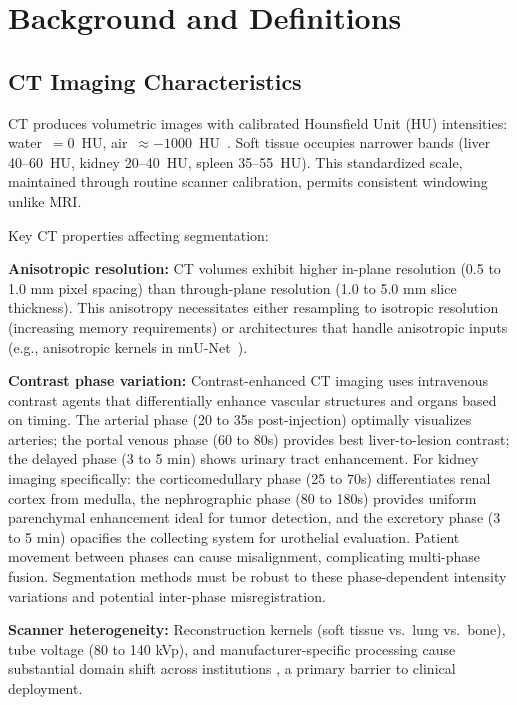 \section{Background and Definitions}
\label{sec:background}

\subsection{CT Imaging Characteristics}

CT produces volumetric images with calibrated Hounsfield Unit (HU) intensities: water~$=0$~HU, air~$\approx$$-1000$~HU~\cite{litjens2017survey}. Soft tissue occupies narrower bands (liver 40--60~HU, kidney 20--40~HU, spleen 35--55~HU). This standardized scale, maintained through routine scanner calibration, permits consistent windowing unlike MRI.

Key CT properties affecting segmentation:

\textbf{Anisotropic resolution:} CT volumes exhibit higher in-plane resolution (0.5 to 1.0 mm pixel spacing) than through-plane resolution (1.0 to 5.0 mm slice thickness). This anisotropy necessitates either resampling to isotropic resolution (increasing memory requirements) or architectures that handle anisotropic inputs (e.g., anisotropic kernels in nnU-Net~\cite{isensee2021nnunet}).

\textbf{Contrast phase variation:} Contrast-enhanced CT imaging uses intravenous contrast agents that differentially enhance vascular structures and organs based on timing. The arterial phase (20 to 35s post-injection) optimally visualizes arteries; the portal venous phase (60 to 80s) provides best liver-to-lesion contrast; the delayed phase (3 to 5 min) shows urinary tract enhancement. For kidney imaging specifically: the corticomedullary phase (25 to 70s) differentiates renal cortex from medulla, the nephrographic phase (80 to 180s) provides uniform parenchymal enhancement ideal for tumor detection, and the excretory phase (3 to 5 min) opacifies the collecting system for urothelial evaluation. Patient movement between phases can cause misalignment, complicating multi-phase fusion. Segmentation methods must be robust to these phase-dependent intensity variations and potential inter-phase misregistration.

\textbf{Scanner heterogeneity:} Reconstruction kernels (soft tissue vs.\ lung vs.\ bone), tube voltage (80 to 140 kVp), and manufacturer-specific processing cause substantial domain shift across institutions \cite{tajbakhsh2020embracing}, a primary barrier to clinical deployment.

